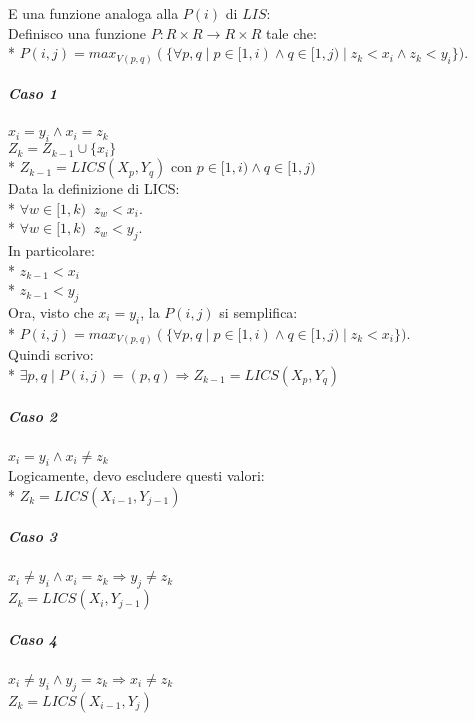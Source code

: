 E una funzione analoga alla $P(i)$ di $LIS$: \\

Definisco una funzione $P : R \times R \rightarrow R \times R$ tale che: \\*
$P(i, j) = max_{V(p, q)}(\{ \forall p,q \mid p \in [1, i) \land q \in [1, j) \mid z_{k} < x_i \land z_{k} < y_i\})$. \\

\subparagraph{Caso 1}

$x_i = y_i \land x_i = z_k$ \\

$Z_k = Z_{k-1} \cup \{x_i\}$ \\*
$Z_{k-1} = LICS(X_p, Y_q)$ con $p \in [1, i) \land q \in [1, j)$ \\

Data la definizione di LICS: \\*
$\forall w \in [1, k) \;\; z_{w} < x_i$. \\*
$\forall w \in [1, k) \;\; z_{w} < y_j$. \\

In particolare: \\*
$z_{k-1} < x_i$ \\*
$z_{k-1} < y_j$ \\

Ora, visto che $x_i = y_i$, la $P(i, j)$ si semplifica: \\*
$P(i, j) = max_{V(p, q)}(\{ \forall p,q \mid p \in [1, i) \land q \in [1, j) \mid z_{k} < x_i\})$. \\

Quindi scrivo: \\*
$\exists p,q \mid P(i, j) = (p, q) \Rightarrow Z_{k-1} = LICS(X_p, Y_q)$ \\

\subparagraph{Caso 2}

$x_i = y_i \land x_i \ne z_k$ \\

Logicamente, devo escludere questi valori: \\*
$Z_k = LICS(X_{i-1}, Y_{j-1})$ \\

\subparagraph{Caso 3}

$x_i \ne y_i \land x_i = z_k \Rightarrow y_j \ne z_k$ \\
$Z_k = LICS(X_{i}, Y_{j-1})$ \\

\subparagraph{Caso 4}

$x_i \ne y_i \land y_j = z_k \Rightarrow x_i \ne z_k$ \\
$Z_k = LICS(X_{i-1}, Y_{j})$ \\

